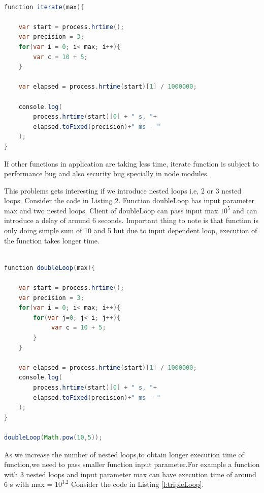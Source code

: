 \documentclass[authoryear,preprint]{sigplanconf}
\begin{document}
\begin{lstlisting}[caption=iterate function with single loop,label=l:iterate,language=Java]

function iterate(max){

    var start = process.hrtime();
    var precision = 3;
    for(var i = 0; i< max; i++){
        var c = 10 + 5;
    }

    var elapsed = process.hrtime(start)[1] / 1000000;
    
	console.log(
		process.hrtime(start)[0] + " s, "+
		elapsed.toFixed(precision)+" ms - " 
	);
}

\end{lstlisting}

If other functions in application are taking less time, iterate
function is subject to performance bug and also security bug specially
in node modules.

This problems gets interesting if we introduce nested loops
i.e, 2 or 3 nested loops. Consider the code in Listing 2. Function
doubleLoop has input parameter max and two nested loops. Client
of doubleLoop can pass input max \begin{math} 10^{5} \end{math}
and can introduce a delay of around 6 seconds. Important thing to note is that function is
only doing simple sum of 10 and 5 but due to input dependent loop,
execution of the function takes longer time.

\begin{lstlisting}[caption=doubleLoop function with two nested loops,label=l:doubleLoop,language=Java]

function doubleLoop(max){

    var start = process.hrtime();
    var precision = 3;
    for(var i = 0; i< max; i++){
    	for(var j=0; j< i; j++){
			 var c = 10 + 5;
 		}
 	}

    var elapsed = process.hrtime(start)[1] / 1000000;
	console.log(
		process.hrtime(start)[0] + " s, "+
		elapsed.toFixed(precision)+" ms - " 
	);
}

doubleLoop(Math.pow(10,5));

\end{lstlisting}

As we increase the number of nested loops,to obtain longer execution time of function,we need to pass smaller function input parameter.For example a function with 3 nested loops and input parameter max
can have execution time of around 6 s with max = \begin{math} 10^{3.2} \end{math}
Consider the code in Listing \ref{l:tripleLoop}.
\end{document}
